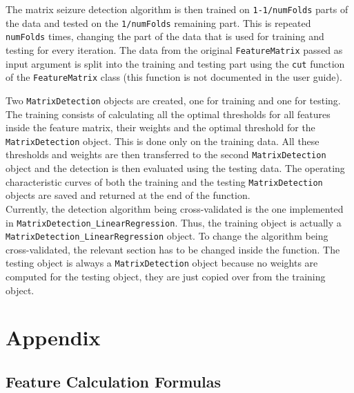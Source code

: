 \documentclass[usletter, 11pt]{extarticle}
\begin{document}
The matrix seizure detection algorithm is then trained on \verb|1-1/numFolds| parts of the data and tested on the \verb|1/numFolds| remaining part. This is repeated \verb|numFolds| times, changing the part of the data that is used for training and testing for every iteration. The data from the original \verb|FeatureMatrix| passed as input argument is split into the training and testing part using the \verb|cut| function of the \verb|FeatureMatrix| class (this function is not documented in the user guide).

Two \verb|MatrixDetection| objects are created, one for training and one for testing. The training consists of calculating all the optimal thresholds for all features inside the feature matrix, their weights and the optimal threshold for the \verb|MatrixDetection| object. This is done only on the training data. All these thresholds and weights are then transferred to the second \verb|MatrixDetection| object and the detection is then evaluated using the testing data. The operating characteristic curves of both the training and the testing \verb|MatrixDetection| objects are saved and returned at the end of the function. \\

Currently, the detection algorithm being cross-validated is the one implemented in \texttt{MatrixDetection\_Linear\-Regression}. Thus, the training object is actually a \verb|MatrixDetection_LinearRegression| object. To change the algorithm being cross-validated, the relevant section has to be changed inside the function. The testing object is always a \verb|MatrixDetection| object because no weights are computed for the testing object, they are just copied over from the training object.


\newpage
\appendix
\section{Appendix} 

\subsection{Feature Calculation Formulas} \label{sec:formulas}
\end{document}
